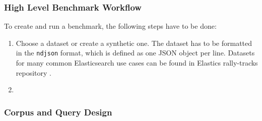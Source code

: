 \subsubsection{High Level Benchmark Workflow}
To create and run a benchmark, the following steps have to be done:
\begin{enumerate}
  \item Choose a dataset or create a synthetic one. The dataset has to be formatted in the \texttt{ndjson} format, which is defined as one JSON object per line. Datasets for many common Elasticsearch use cases can be found in Elastics rally-tracks repository \cite{rallytracks}.
  \item 
\end{enumerate}

\subsubsection{Corpus and Query Design}


